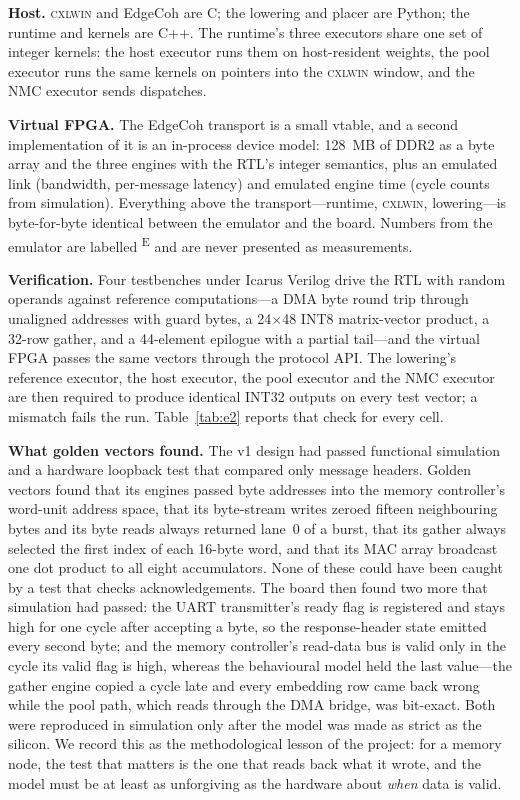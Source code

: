 \documentclass[lettersize,journal]{IEEEtran}
\newcommand{\cxlwin}{\textsc{cxlwin}}
\newcommand{\E}{\textsuperscript{E}}
\begin{document}
\textbf{Host.} \cxlwin{} and EdgeCoh are C; the lowering and placer are Python; the runtime and kernels are C++. The runtime's three executors share one set of integer kernels: the host executor runs them on host-resident weights, the pool executor runs the same kernels on pointers into the \cxlwin{} window, and the NMC executor sends dispatches.

\textbf{Virtual FPGA.} The EdgeCoh transport is a small vtable, and a second implementation of it is an in-process device model: 128~MB of DDR2 as a byte array and the three engines with the RTL's integer semantics, plus an emulated link (bandwidth, per-message latency) and emulated engine time (cycle counts from simulation). Everything above the transport---runtime, \cxlwin{}, lowering---is byte-for-byte identical between the emulator and the board. Numbers from the emulator are labelled \E{} and are never presented as measurements.

\textbf{Verification.} Four testbenches under Icarus Verilog drive the RTL with random operands against reference computations---a DMA byte round trip through unaligned addresses with guard bytes, a 24$\times$48 INT8 matrix-vector product, a 32-row gather, and a 44-element epilogue with a partial tail---and the virtual FPGA passes the same vectors through the protocol API. The lowering's reference executor, the host executor, the pool executor and the NMC executor are then required to produce identical INT32 outputs on every test vector; a mismatch fails the run. Table~\ref{tab:e2} reports that check for every cell.

\textbf{What golden vectors found.} The v1 design had passed functional simulation and a hardware loopback test that compared only message headers. Golden vectors found that its engines passed byte addresses into the memory controller's word-unit address space, that its byte-stream writes zeroed fifteen neighbouring bytes and its byte reads always returned lane~0 of a burst, that its gather always selected the first index of each 16-byte word, and that its MAC array broadcast one dot product to all eight accumulators. None of these could have been caught by a test that checks acknowledgements. The board then found two more that simulation had passed: the UART transmitter's ready flag is registered and stays high for one cycle after accepting a byte, so the response-header state emitted every second byte; and the memory controller's read-data bus is valid only in the cycle its valid flag is high, whereas the behavioural model held the last value---the gather engine copied a cycle late and every embedding row came back wrong while the pool path, which reads through the DMA bridge, was bit-exact. Both were reproduced in simulation only after the model was made as strict as the silicon. We record this as the methodological lesson of the project: for a memory node, the test that matters is the one that reads back what it wrote, and the model must be at least as unforgiving as the hardware about \emph{when} data is valid.
\end{document}
